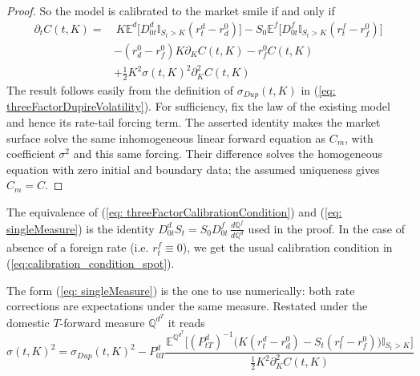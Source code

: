\begin{proof}
So the model is calibrated to the market smile if and only if 
\begin{align*}
\partial_tC(t,K) =  & \ K\mathbb{E}^d\big[ D^d_{0t}\mathbb{I}_{S_t>K}(r_t^d - r_d^0 )\big] -  S_0\mathbb{E}^f\big[D^f_{0t}\mathbb{I}_{S_t>K}(r_t^f - r_f^0 )\big]\\
& - (r_d^0 - r_f^0) K \partial_K C(t,K) - r_f^0 C(t,K)  \\
& + \frac{1}{2}K^2\sigma(t,K)^2\partial_K^2C(t,K)
\end{align*}
The result follows easily from the definition of $\sigma_{Dup}(t,K)$ in (\ref{eq: threeFactorDupireVolatility}). For sufficiency, fix the law of the existing
model and hence its rate-tail forcing term. The asserted identity makes the
market surface solve the same inhomogeneous linear forward equation as $C_m$,
with coefficient $\sigma^2$ and this same forcing. Their difference solves the
homogeneous equation with zero initial and boundary data; the assumed
uniqueness gives $C_m=C$.
\end{proof}

\begin{rem}
The equivalence of (\ref{eq: threeFactorCalibrationCondition}) and (\ref{eq: singleMeasure}) is the identity $D^d_{0t}S_t=S_0D^f_{0t}\,\frac{d\mathbb{Q}^f}{d\mathbb{Q}^d}$ used in the proof. In the case of absence of a foreign rate (i.e. $r^f_t\equiv 0$), we get the usual calibration condition in (\ref{eq:calibration_condition_spot}).
\end{rem}

The form (\ref{eq: singleMeasure}) is the one to use numerically: both rate corrections are expectations under the same measure. Restated under the domestic $T$-forward measure $\mathbb{Q}^{d^T}$ it reads
\begin{equation}\label{eq: threeFactorCalibrationConditionForward}
\sigma(t,K)^2 = \sigma_{Dup}(t,K)^2  - P^d_{0T}\frac{ \mathbb{E}^{\mathbb{Q}^{d^T}}\big[ (P^d_{tT})^{-1}\big(K(r_t^d-r^0_d)-S_t(r_t^f-r^0_f)\big)\mathbb{I}_{S_t>K} \big]}{ \frac{1}{2}K^2\partial^2_KC(t,K) }
\end{equation}

